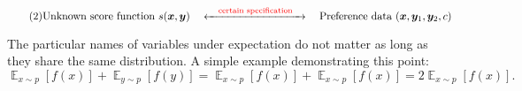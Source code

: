 \documentclass[preview]{standalone}
\begin{document}
\def\svgwidth{4.0in}

\begin{tcolorbox}[center]
    \begin{equation}
        \label{eq:general_spec} \tag{2}
\text{Unknown score function } s(\bm{x}, \bm{y}) \quad \xleftrightarrow{\quad \text{\color{red}certain specification}\quad } \quad \text{Preference data } (\bm{x}, \bm{y}_1, \bm{y}_2, c)
    \end{equation} 
\end{tcolorbox}


\begin{tcolorbox}[center]
\end{tcolorbox}

\begin{tcolorbox}[center]
\end{tcolorbox}


\begin{tcolorbox}[center,colback=white]
The particular names of variables under expectation do not matter as long as they share the same distribution. A simple example demonstrating this point:
\[
\mathop{\mathbb{E}}_{x \sim p}[f(x)] + \mathop{\mathbb{E}}_{y \sim p}[f(y)]
= \mathop{\mathbb{E}}_{x \sim p}[f(x)] + \mathop{\mathbb{E}}_{x \sim p}[f(x)]
= 2\mathop{\mathbb{E}}_{x\sim p}[f(x)].
\]
\end{tcolorbox}
\end{document}
